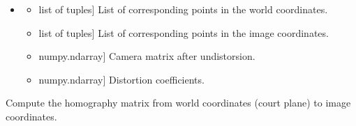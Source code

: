 \documentclass[letterpaper,10pt,english]{sphinxmanual}
\begin{document}
\begin{fulllineitems}
\begin{fulllineitems}
\begin{itemize}
\begin{description}
\begin{itemize}
\begin{description}
\end{description}

\end{itemize}

\end{description}

\item {} \begin{description}
\begin{itemize}
\item {} \begin{description}
\sphinxlineitem{\sphinxtitleref{self.corr\_world\_points}}{[}list of tuples{]}
\sphinxAtStartPar
List of corresponding points in the world coordinates.

\end{description}

\item {} \begin{description}
\sphinxlineitem{\sphinxtitleref{self.corr\_image\_points}}{[}list of tuples{]}
\sphinxAtStartPar
List of corresponding points in the image coordinates.

\end{description}

\item {} \begin{description}
\sphinxlineitem{\sphinxtitleref{self.new\_mtx}}{[}numpy.ndarray{]}
\sphinxAtStartPar
Camera matrix after undistorsion.

\end{description}

\item {} \begin{description}
\sphinxlineitem{\sphinxtitleref{self.dist}}{[}numpy.ndarray{]}
\sphinxAtStartPar
Distortion coefficients.

\end{description}

\end{itemize}

\end{description}

\end{itemize}

\end{fulllineitems}


\begin{fulllineitems}
\label{\detokenize{CameraUtils:id8}}
\pysigstartsignatures
{}
\pysigstopsignatures
\sphinxAtStartPar
Compute the homography matrix from world coordinates (court plane) to image coordinates.


\end{fulllineitems}
\end{fulllineitems}
\end{document}
